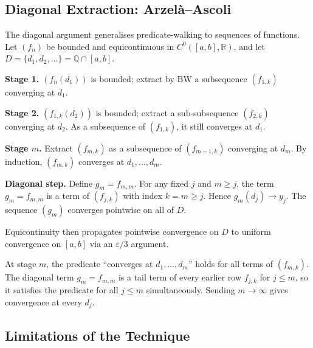 \subsection*{Diagonal Extraction: Arzel\`a--Ascoli}
\label{subsec:diagonal-extraction}

\begin{remark}
\label{rem:arzela-ascoli}
The diagonal argument generalises predicate-walking to sequences of
functions. Let $(f_n)$ be bounded and equicontinuous in
$C^0([a,b],\mathbb{R})$, and let $D=\{d_1,d_2,\ldots\}=\mathbb{Q}\cap[a,b]$.

\medskip
\noindent\textbf{Stage 1.} $(f_n(d_1))$ is bounded; extract by BW a
subsequence $(f_{1,k})$ converging at $d_1$.

\noindent\textbf{Stage 2.} $(f_{1,k}(d_2))$ is bounded; extract a
sub-subsequence $(f_{2,k})$ converging at $d_2$. As a subsequence of
$(f_{1,k})$, it still converges at $d_1$.

\noindent\textbf{Stage $m$.} Extract $(f_{m,k})$ as a subsequence of
$(f_{m-1,k})$ converging at $d_m$. By induction, $(f_{m,k})$ converges
at $d_1,\ldots,d_m$.

\noindent\textbf{Diagonal step.} Define $g_m=f_{m,m}$. For any fixed $j$
and $m\geq j$, the term $g_m=f_{m,m}$ is a term of $(f_{j,k})$ with
index $k=m\geq j$. Hence $g_m(d_j)\to y_j$. The sequence $(g_m)$
converges pointwise on all of $D$.

\medskip
Equicontinuity then propagates pointwise convergence on $D$ to uniform
convergence on $[a,b]$ via an $\varepsilon/3$ argument.
\end{remark}

\begin{remark}
At stage $m$, the predicate ``converges at $d_1,\ldots,d_m$'' holds for
all terms of $(f_{m,k})$. The diagonal term $g_m=f_{m,m}$ is a tail term
of every earlier row $f_{j,k}$ for $j\leq m$, so it satisfies the
predicate for all $j\leq m$ simultaneously. Sending $m\to\infty$ gives
convergence at every $d_j$.
\end{remark}



\subsection*{Limitations of the Technique}
\label{subsec:predicate-limitations}

